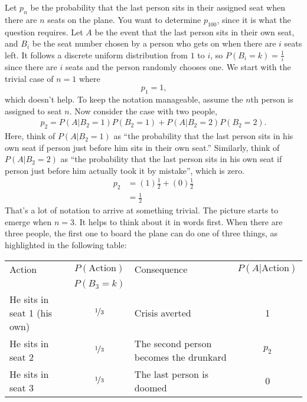 \documentclass[a4paper]{article}
\begin{document}
Let $p_n$ be the probability that the last person sits in their assigned seat when there are $n$ seats on the plane.
You want to determine $p_{100}$, since it is what the question requires.
Let $A$ be the event that the last person sits in their own seat, and $B_i$ be the seat number chosen by a person who gets on when there are $i$ seats left.
It follows a discrete uniform distribution from $1$ to $i$, so $P(B_i = k) = \frac{1}{i}$ since there are $i$ seats and the person randomly chooses one.
We start with the trivial case of $n=1$ where
\[
  p_1 = 1
  \text{,}
\]
which doesn't help.
To keep the notation manageable, assume the $n$th person is assigned to seat $n$.
Now consider the case with two people,
\begin{align*}
  p_2 = P(A|B_2 = 1)P(B_2=1) + P(A|B_2 = 2)P(B_2=2)
  \text{.}
\end{align*}
Here, think of  $P(A|B_2 = 1)$ as ``the probability that the last person sits in his own seat if person just before him sits in their own seat.''
Similarly, think of  $P(A|B_2 = 2)$ as ``the probability that the last person sits in his own seat if person just before him actually took it by mistake'', which is zero.
\begin{align*}
  p_2 &= (1)\frac{1}{2} + (0)\frac{1}{2} \\
  &= \frac{1}{2}
\end{align*}
That's a lot of notation to arrive at something trivial.
The picture starts to emerge when $n=3$.
It helps to think about it in words first.
When there are three people, the first one to board the plane can do one of three things, as highlighted in the following table:
\begin{center}
\begin{tabular}{lclc}
\hline
 Action                    & $P(\text{Action})$ &  Consequence                             & $P(A|\text{Action})$ \\
                           & $P(B_3 = k)$       &                                          &               \\
 \hline
He sits in seat 1 (his own)& $\nicefrac{1}{3}$  &  Crisis averted                          & 1\\
He sits in seat 2          & $\nicefrac{1}{3}$  &  The second person becomes the drunkard  & $p_2$\\
He sits in seat 3          & $\nicefrac{1}{3}$  &  The last person is doomed               & 0\\
\hline
\end{tabular}
\end{center}
\end{document}
